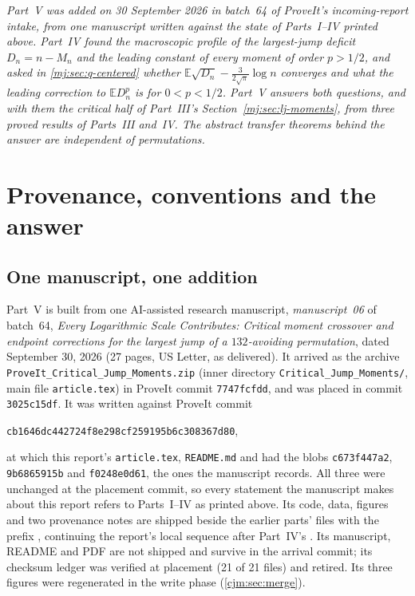 \documentclass[11pt,a4paper]{article}
\theoremstyle{definition}\newaliascnt{definition}{theorem}
\theoremstyle{remark}\newaliascnt{remark}{theorem}
\newcommand{\ljE}{\mathbb E}
\newcommand{\cjsha}{\texttt{cb1646dc442724f8e298cf259195b6c308367d80}}
\begin{document}
\noindent\emph{Part~V was added on 30 September 2026 in batch~64 of
ProveIt's incoming-report intake, from one manuscript written against the
state of Parts~I--IV printed above. Part~IV found the macroscopic profile of
the largest-jump deficit $D_n=n-M_n$ and the leading constant of every moment
of order $p>1/2$, and asked in \cref{mj:sec:q-centered} whether
$\ljE\sqrt{D_n}-\frac3{2\sqrt\pi}\log n$ converges and what the leading
correction to $\ljE D_n^p$ is for $0<p<1/2$. Part~V answers both questions,
and with them the critical half of Part~III's
Section~\ref{mj:sec:lj-moments}, from three proved results of Parts~III
and~IV. The abstract transfer theorems behind the answer are independent of
permutations.}

\section{Provenance, conventions and the answer}
\label{cjm:sec:intro}

\subsection{One manuscript, one addition}
\label{cjm:sec:source}
Part~V is built from one AI-assisted research manuscript,
\emph{manuscript~06} of batch~64, \emph{Every Logarithmic Scale
Contributes: Critical moment crossover and endpoint corrections for the
largest jump of a $132$-avoiding permutation}, dated September 30, 2026
(27 pages, US Letter, as delivered). It arrived as the archive
\texttt{ProveIt\_Critical\_Jump\_Moments.zip} (inner directory
\texttt{Critical\_Jump\_Moments/}, main file \texttt{article.tex}) in ProveIt
commit \texttt{7747fcfdd}, and was placed in commit \texttt{3025c15df}. It
was written against ProveIt commit
\begin{center}\small\cjsha,\end{center}
at which this report's \texttt{article.tex}, \texttt{README.md} and
 had the blobs
\texttt{c673f447a2}, \texttt{9b6865915b} and \texttt{f0248e0d61}, the ones
the manuscript records. All three were unchanged at the placement commit, so
every statement the manuscript makes about this report refers to Parts~I--IV
as printed above. Its code, data, figures and two provenance notes are
shipped beside the earlier parts' files with the prefix
, continuing the report's local sequence after
Part~IV's . Its manuscript, README and PDF are
not shipped and survive in the arrival commit; its checksum ledger was
verified at placement (21 of 21 files) and retired. Its three figures were
regenerated in the write phase (\cref{cjm:sec:merge}).
\end{document}
